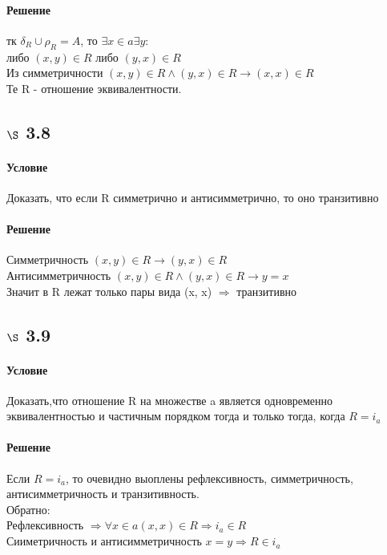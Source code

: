 \documentclass[a4paper,12pt]{article}
\begin{document}
\paragraph*{Решение}
тк $\delta_R\cup\rho_R = A$, то $\exists x \in a \exists y:$\\
либо $(x, y) \in R$ либо $(y, x) \in R$ \\
Из симметричности $(x, y) \in R \wedge (y, x) \in R \rightarrow (x, x) \in R$\\
Те R - отношение эквивалентности.

\subsection*{$\S$ 3.8}
\paragraph*{Условие}
Доказать, что если R симметрично и антисимметрично, то оно транзитивно
\paragraph*{Решение}
Симметричность $(x, y) \in R \rightarrow (y, x) \in R$\\
Антисимметричность $(x, y) \in R \wedge (y, x) \in R \rightarrow y = x$\\
Значит в R лежат только пары вида (x, x) $\Rightarrow$ транзитивно

\subsection*{$\S$ 3.9}
\paragraph*{Условие}
Доказать,что отношение R на множестве a является одновременно эквивалентностью и частичным порядком тогда и только тогда, когда $ R = i_a$
\paragraph*{Решение}
Если $ R = i_a$, то очевидно выоплены рефлексивность, симметричность, антисимметричность и транзитивность.\\
Обратно:\\
Рефлексивность $\Rightarrow \forall x \in a (x, x) \in R \Rightarrow i_a \in R$\\
Сииметричность и антисимметричность $ x = y \Rightarrow R \in  i_a $
\end{document}
